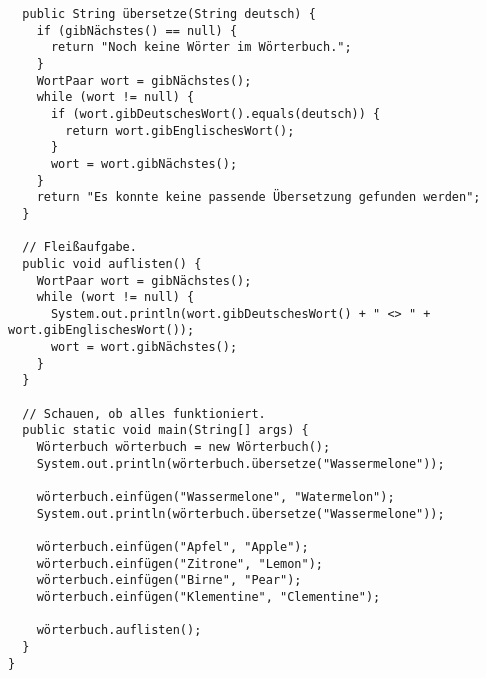 \documentclass{lehramt-informatik}
\begin{document}
\begin{itemize}
\begin{verbatim}
  public String übersetze(String deutsch) {
    if (gibNächstes() == null) {
      return "Noch keine Wörter im Wörterbuch.";
    }
    WortPaar wort = gibNächstes();
    while (wort != null) {
      if (wort.gibDeutschesWort().equals(deutsch)) {
        return wort.gibEnglischesWort();
      }
      wort = wort.gibNächstes();
    }
    return "Es konnte keine passende Übersetzung gefunden werden";
  }

  // Fleißaufgabe.
  public void auflisten() {
    WortPaar wort = gibNächstes();
    while (wort != null) {
      System.out.println(wort.gibDeutschesWort() + " <> " + wort.gibEnglischesWort());
      wort = wort.gibNächstes();
    }
  }

  // Schauen, ob alles funktioniert.
  public static void main(String[] args) {
    Wörterbuch wörterbuch = new Wörterbuch();
    System.out.println(wörterbuch.übersetze("Wassermelone"));

    wörterbuch.einfügen("Wassermelone", "Watermelon");
    System.out.println(wörterbuch.übersetze("Wassermelone"));

    wörterbuch.einfügen("Apfel", "Apple");
    wörterbuch.einfügen("Zitrone", "Lemon");
    wörterbuch.einfügen("Birne", "Pear");
    wörterbuch.einfügen("Klementine", "Clementine");

    wörterbuch.auflisten();
  }
}
\end{verbatim}
\end{itemize}
\end{document}

